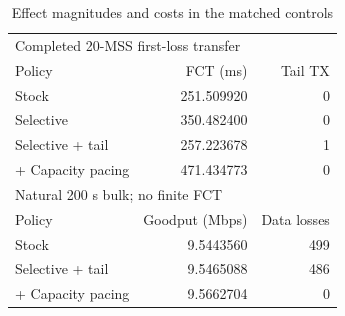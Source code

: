 \begin{table}[t]
\caption{Effect magnitudes and costs in the matched controls}
\label{tab:magnitudes}
\centering
\begin{tabular}{lrr}
\toprule
\multicolumn{3}{l}{Completed 20-MSS first-loss transfer}\\
Policy & FCT (ms) & Tail TX\\
\midrule
Stock & 251.509920 & 0\\
Selective & 350.482400 & 0\\
Selective + tail & 257.223678 & 1\\
+ Capacity pacing & 471.434773 & 0\\
\midrule
\multicolumn{3}{l}{Natural 200 s bulk; no finite FCT}\\
Policy & Goodput (Mbps) & Data losses\\
\midrule
Stock & 9.5443560 & 499\\
Selective + tail & 9.5465088 & 486\\
+ Capacity pacing & 9.5662704 & 0\\
\bottomrule
\end{tabular}
\end{table}

